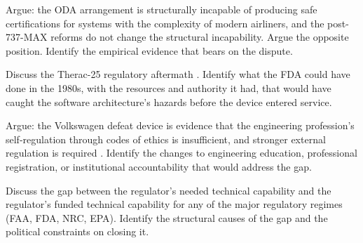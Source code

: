 \begin{exercise}
Argue: the ODA arrangement is structurally incapable of producing safe certifications for systems with the complexity of modern airliners, and the post-737-MAX reforms do not change the structural incapability. Argue the opposite position. Identify the empirical evidence that bears on the dispute.
\end{exercise}

\begin{exercise}
Discuss the Therac-25 regulatory aftermath \cite{paper:leveson-turner1993}. Identify what the FDA could have done in the 1980s, with the resources and authority it had, that would have caught the software architecture's hazards before the device entered service.
\end{exercise}

\begin{exercise}
Argue: the Volkswagen defeat device is evidence that the engineering profession's self-regulation through codes of ethics is insufficient, and stronger external regulation is required \cite{acc:epa-vw-nov-2015}. Identify the changes to engineering education, professional registration, or institutional accountability that would address the gap.
\end{exercise}

\begin{exercise}
Discuss the gap between the regulator's needed technical capability and the regulator's funded technical capability for any of the major regulatory regimes (FAA, FDA, NRC, EPA). Identify the structural causes of the gap and the political constraints on closing it.
\end{exercise}
